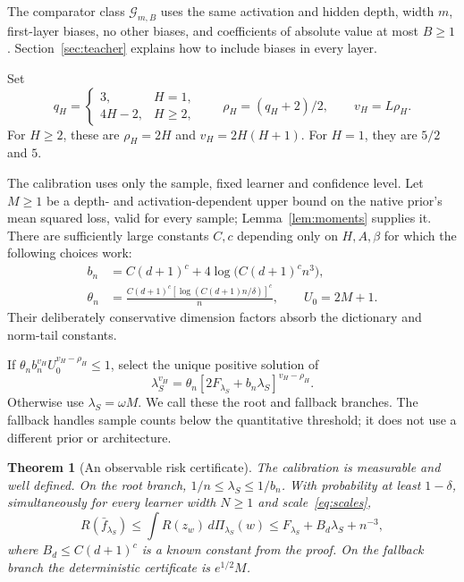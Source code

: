 \documentclass[11pt]{article}
\newtheorem{theorem}{Theorem}[section]\newtheorem{lemma}[theorem]{Lemma}
\theoremstyle{remark}\newtheorem{remark}[theorem]{Remark}
\newcommand{\calG}{\mathcal G}
\begin{document}
The comparator class $\calG_{m,B}$ uses the same activation and hidden depth, width $m$, first-layer biases, no other biases, and coefficients of absolute value at most $B\ge1$. Section~\ref{sec:teacher} explains how to include biases in every layer.

Set
\[
 q_H=\begin{cases}3,&H=1,\\4H-2,&H\ge2,\end{cases}
 \qquad \rho_H=(q_H+2)/2,\qquad v_H=L\rho_H.
\]
For $H\ge2$, these are $\rho_H=2H$ and $v_H=2H(H+1)$.
For $H=1$, they are $5/2$ and $5$.

The calibration uses only the sample, fixed learner and confidence level.
Let $M\ge1$ be a depth- and activation-dependent upper bound on the native prior's mean squared loss, valid for every sample; Lemma~\ref{lem:moments} supplies it. There are sufficiently large constants $C,c$ depending only on $H,A,\beta$ for which the following choices work:
\begin{align}
 b_n&=C(d+1)^c+4\log\!\bigl(C(d+1)^c n^3\bigr),\\
 \theta_n&=\frac{C(d+1)^c[\log(C(d+1)n/\delta)]^c}{n},
 \qquad U_0=2M+1.
 \label{eq:calibration-data}
\end{align}
Their deliberately conservative dimension factors absorb the dictionary and norm-tail constants.

If $\theta_n b_n^{v_H}U_0^{v_H-\rho_H}\le1$, select the unique positive solution of
\begin{equation}
 \lambda_S^{v_H}
 =\theta_n[2F_{\lambda_S}+b_n\lambda_S]^{v_H-\rho_H}.
 \label{eq:root}
\end{equation}
Otherwise use $\lambda_S=\omega M$. We call these the root and fallback branches. The fallback handles sample counts below the quantitative threshold; it does not use a different prior or architecture.

\begin{theorem}[An observable risk certificate]
\label{thm:certificate}
The calibration is measurable and well defined. On the root branch,
$1/n\le\lambda_S\le1/b_n$. With probability at least $1-\delta$, simultaneously for every learner width $N\ge1$ and scale~\eqref{eq:scales},
\begin{equation}
 R(\bar f_{\lambda_S})
 \le\int R(z_w)\,d\Pi_{\lambda_S}(w)
 \le F_{\lambda_S}+B_d\lambda_S+n^{-3},
 \label{eq:certificate}
\end{equation}
where $B_d\le C(d+1)^c$ is a known constant from the proof.
On the fallback branch the deterministic certificate is $e^{1/2}M$.
\end{theorem}
\end{document}
